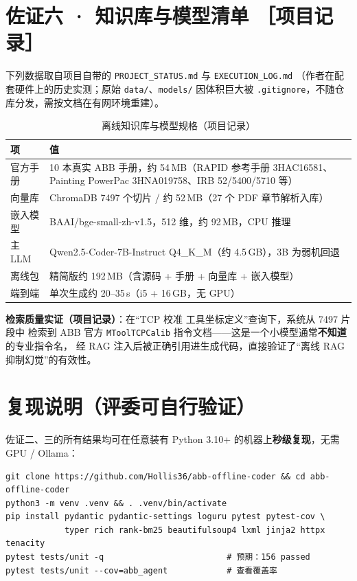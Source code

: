 \documentclass[11pt,a4paper,fontset=none]{ctexart}
\begin{document}
\section{佐证六 · 知识库与模型清单 \normalfont\small［项目记录］}

下列数据取自项目自带的 \texttt{PROJECT\_STATUS.md} 与 \texttt{EXECUTION\_LOG.md}
（作者在配套硬件上的历史实测；原始 \texttt{data/}、\texttt{models/} 因体积巨大被
\texttt{.gitignore}，不随仓库分发，需按文档在有网环境重建）。

\begin{table}[h]
\centering
\caption{离线知识库与模型规格（项目记录）}
\small
\begin{tabularx}{\textwidth}{@{}l X@{}}
\toprule
\textbf{项} & \textbf{值} \\
\midrule
官方手册   & 10 本真实 ABB 手册，约 54\,MB（RAPID 参考手册 3HAC16581、Painting PowerPac 3HNA019758、IRB 52/5400/5710 等）\\
向量库     & ChromaDB 7497 个切片 / 约 52\,MB（27 个 PDF 章节解析入库）\\
嵌入模型   & BAAI/bge-small-zh-v1.5，512 维，约 92\,MB，CPU 推理 \\
主 LLM     & Qwen2.5-Coder-7B-Instruct Q4\_K\_M（约 4.5\,GB），3B 为弱机回退 \\
离线包     & 精简版约 192\,MB（含源码 + 手册 + 向量库 + 嵌入模型）\\
端到端     & 单次生成约 20--35\,s（i5 + 16\,GB，无 GPU）\\
\bottomrule
\end{tabularx}
\end{table}

\noindent\textbf{检索质量实证（项目记录）}：在“TCP 校准 工具坐标定义”查询下，系统从 7497 片段中
检索到 ABB 官方 \texttt{MToolTCPCalib} 指令文档——这是一个小模型通常\textbf{不知道}的专业指令名，
经 RAG 注入后被正确引用进生成代码，直接验证了“离线 RAG 抑制幻觉”的有效性。

\section{复现说明（评委可自行验证）}

佐证二、三的所有结果均可在任意装有 Python 3.10+ 的机器上\textbf{秒级复现}，无需 GPU / Ollama：

\begin{lstlisting}[style=base,caption={一键复现单元测试与覆盖率}]
git clone https://github.com/Hollis36/abb-offline-coder && cd abb-offline-coder
python3 -m venv .venv && . .venv/bin/activate
pip install pydantic pydantic-settings loguru pytest pytest-cov \
            typer rich rank-bm25 beautifulsoup4 lxml jinja2 httpx tenacity
pytest tests/unit -q                         # 预期：156 passed
pytest tests/unit --cov=abb_agent            # 查看覆盖率
\end{lstlisting}
\end{document}
